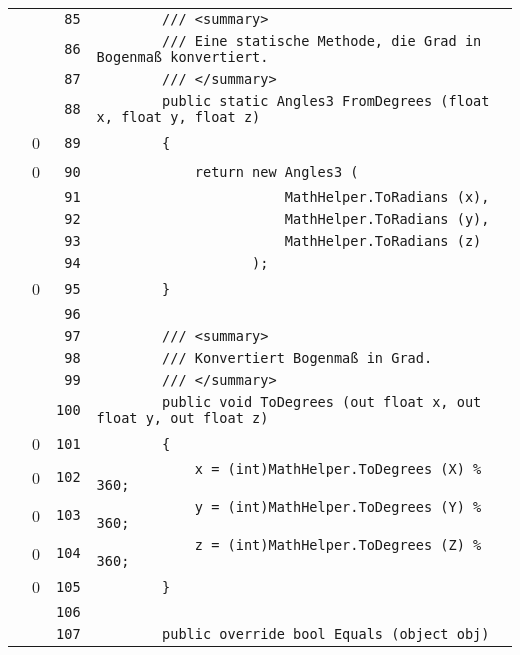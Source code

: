\documentclass[a4paper,10pt]{article}
\begin{document}
\begin{longtable}[l]{lrrl}
\cellcolor{gray} &  & \verb~85~ & \verb~        /// <summary>~\\
\cellcolor{gray} &  & \verb~86~ & \verb~        /// Eine statische Methode, die Grad in Bogenmaß konvertiert.~\\
\cellcolor{gray} &  & \verb~87~ & \verb~        /// </summary>~\\
\cellcolor{gray} &  & \verb~88~ & \verb~        public static Angles3 FromDegrees (float x, float y, float z)~\\
\cellcolor{red} & 0 & \verb~89~ & \verb~        {~\\
\cellcolor{red} & 0 & \verb~90~ & \verb~            return new Angles3 (~\\
\cellcolor{gray} &  & \verb~91~ & \verb~                       MathHelper.ToRadians (x),~\\
\cellcolor{gray} &  & \verb~92~ & \verb~                       MathHelper.ToRadians (y),~\\
\cellcolor{gray} &  & \verb~93~ & \verb~                       MathHelper.ToRadians (z)~\\
\cellcolor{gray} &  & \verb~94~ & \verb~                   );~\\
\cellcolor{red} & 0 & \verb~95~ & \verb~        }~\\
\cellcolor{gray} &  & \verb~96~ & \verb~~\\
\cellcolor{gray} &  & \verb~97~ & \verb~        /// <summary>~\\
\cellcolor{gray} &  & \verb~98~ & \verb~        /// Konvertiert Bogenmaß in Grad.~\\
\cellcolor{gray} &  & \verb~99~ & \verb~        /// </summary>~\\
\cellcolor{gray} &  & \verb~100~ & \verb~        public void ToDegrees (out float x, out float y, out float z)~\\
\cellcolor{red} & 0 & \verb~101~ & \verb~        {~\\
\cellcolor{red} & 0 & \verb~102~ & \verb~            x = (int)MathHelper.ToDegrees (X) % 360;~\\
\cellcolor{red} & 0 & \verb~103~ & \verb~            y = (int)MathHelper.ToDegrees (Y) % 360;~\\
\cellcolor{red} & 0 & \verb~104~ & \verb~            z = (int)MathHelper.ToDegrees (Z) % 360;~\\
\cellcolor{red} & 0 & \verb~105~ & \verb~        }~\\
\cellcolor{gray} &  & \verb~106~ & \verb~~\\
\cellcolor{gray} &  & \verb~107~ & \verb~        public override bool Equals (object obj)~\\

\end{longtable}
\end{document}
